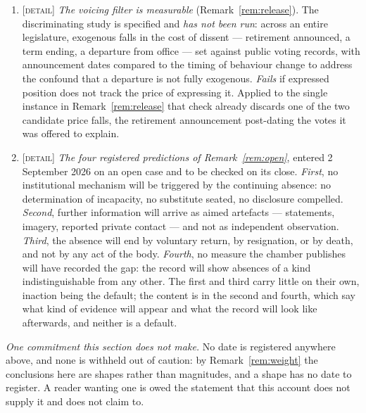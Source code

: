 \documentclass[11pt,a4paper]{article}
\theoremstyle{remark}
\begin{document}
\begin{enumerate}[leftmargin=2em]
\item \textsc{[detail]} \emph{The voicing filter is measurable} (Remark~\ref{rem:release}). The
discriminating study is specified and \emph{has not been run}: across an entire legislature, exogenous
falls in the cost of dissent --- retirement announced, a term ending, a departure from office --- set
against public voting records, with announcement dates compared to the timing of behaviour change to
address the confound that a departure is not fully exogenous. \emph{Fails} if expressed position does not
track the price of expressing it. Applied to the single instance in Remark~\ref{rem:release} that check
already discards one of the two candidate price falls, the retirement announcement post-dating the votes
it was offered to explain.

\item \textsc{[detail]} \emph{The four registered predictions of Remark~\ref{rem:open}}, entered 2
September 2026 on an open case and to be checked on its close. \emph{First}, no institutional mechanism
will be triggered by the continuing absence: no determination of incapacity, no substitute seated, no
disclosure compelled. \emph{Second}, further information will arrive as aimed artefacts --- statements,
imagery, reported private contact --- and not as independent observation. \emph{Third}, the absence will
end by voluntary return, by resignation, or by death, and not by any act of the body. \emph{Fourth}, no
measure the chamber publishes will have recorded the gap: the record will show absences of a kind
indistinguishable from any other. The first and third carry little on their own, inaction being the
default; the content is in the second and fourth, which say what kind of evidence will appear and what
the record will look like afterwards, and neither is a default.

\end{enumerate}

\emph{One commitment this section does not make.} No date is registered anywhere above, and none is
withheld out of caution: by Remark~\ref{rem:weight} the conclusions here are shapes rather than
magnitudes, and a shape has no date to register. A reader wanting one is owed the statement that this
account does not supply it and does not claim to.
\end{document}
